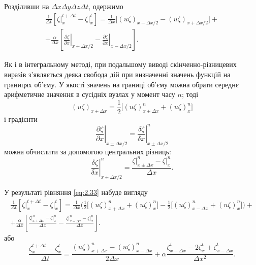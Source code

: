 Розділивши на $\Delta x \Delta y \Delta z \Delta t$, одержимо
\begin{multline}
    \label{eq:2.33}
    \frac{1}{\Delta t} \left[ \left. \zeta \right|_x^{t + \Delta t} - \left. \zeta \right|_x^t \right] = \frac{1}{\Delta x} \Big[ (u \zeta)_{x - \Delta x / 2} - (u \zeta)_{x + \Delta x / 2} \Big] + \\ + \frac{\alpha}{\Delta x} \left[ \left. \frac{\partial \zeta}{\partial x} \right|_{x + \Delta x / 2} - \left. \frac{\partial \zeta}{\partial x} \right|_{x - \Delta x / 2} \right].
\end{multline}

Як і в інтегральному методі, при подальшому виводі скінченно-різницевих виразів з'являється деяка свобода дій при визначенні значень функцій на границях об'єму. У якості значень на границі об'єму можна обрати середнє арифметичне значення в сусідніх вузлах у момент часу $n$; тоді
\begin{equation*}
    (u \zeta)_{x \pm \Delta x} = \frac{1}{2} \Big[ (u \zeta)_{x \pm \Delta x}^n + (u \zeta)_x^n \Big]
\end{equation*}
і градієнти
\begin{equation*}
    \left. \frac{\partial \zeta}{\partial x} \right|_{x \pm \Delta x / 2} = \left. \frac{\delta \zeta}{\delta x} \right|_{x \pm \Delta x / 2}^n
\end{equation*}
можна обчислити за допомогою центральних різниць:
\begin{equation*}
    \left. \frac{\delta \zeta}{\delta x} \right|_{x \pm \Delta x / 2}^n = \frac{\left. \zeta \right|_{x \pm \Delta x}^n - \left. \zeta \right|_x^n}{\Delta x}.
\end{equation*}
 
У результаті рівняння \eqref{eq:2.33} набуде вигляду
\begin{multline}
    \label{eq:2.34}
    \frac{1}{\Delta t} \left[ \left. \zeta \right|_x^{t + \Delta t} - \left. \zeta \right|_x^t \right] = \frac{1}{\Delta x} \Bigg( \frac{1}{2} \Big[ (u \zeta)_{x + \Delta x}^n + (u \zeta)_x^n \Big] - \frac{1}{2} \Big[ (u \zeta)_{x - \Delta x}^n + (u \zeta)_x^n \Big] \Bigg) + \\ + \frac{\alpha}{\Delta x} \left[ \frac{\left. \zeta \right|_{x + \Delta x}^n - \left. \zeta \right|_x^n}{\Delta x} - \frac{\left. \zeta \right|_{x - \Delta x}^n - \left. \zeta \right|_x^n}{\Delta x} \right].
\end{multline}
або
\begin{equation}
    \label{eq:2.35}
    \frac{\zeta_x^{t + \Delta t} - \zeta_x^t}{\Delta t} = \frac{(u \zeta)_{x + \Delta x}^n - (u \zeta)_{x - \Delta x}^n}{2\Delta x} + \alpha \frac{\zeta_{x + \Delta x}^t - 2 \zeta_x^t + \zeta_{x - \Delta x}^t}{\Delta x^2}.
\end{equation}

